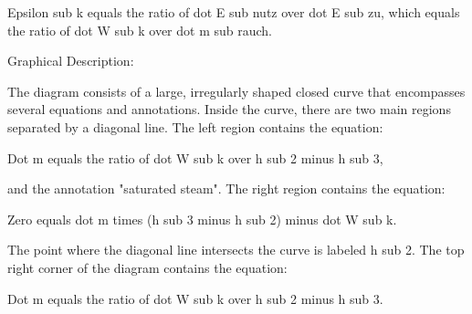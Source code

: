 Epsilon sub k equals the ratio of dot E sub nutz over dot E sub zu, which equals the ratio of dot W sub k over dot m sub rauch.

Graphical Description:

The diagram consists of a large, irregularly shaped closed curve that encompasses several equations and annotations. Inside the curve, there are two main regions separated by a diagonal line. The left region contains the equation:

Dot m equals the ratio of dot W sub k over h sub 2 minus h sub 3,

and the annotation "saturated steam". The right region contains the equation:

Zero equals dot m times (h sub 3 minus h sub 2) minus dot W sub k.

The point where the diagonal line intersects the curve is labeled h sub 2. The top right corner of the diagram contains the equation:

Dot m equals the ratio of dot W sub k over h sub 2 minus h sub 3.